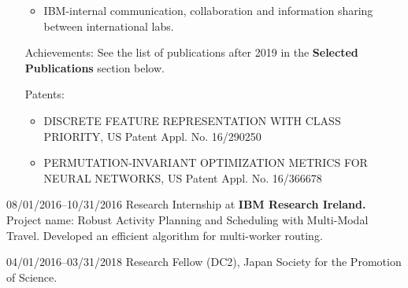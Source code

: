 \documentclass[letterpaper,11pt]{article}
\begin{document}
\begin{CV}
\begin{itemize}
\begin{itemize}
               \item IBM-internal communication, collaboration and information sharing between international labs.
              \end{itemize}
 \item[Achievements:] See the list of publications after 2019 in the \textbf{Selected Publications} section below.
 \item[Patents:]
              \begin{itemize}
               \item DISCRETE FEATURE REPRESENTATION WITH CLASS PRIORITY, US Patent Appl. No. 16/290250
               \item PERMUTATION-INVARIANT OPTIMIZATION METRICS FOR NEURAL NETWORKS, US Patent Appl. No. 16/366678
              \end{itemize}
\end{itemize}

\item[08/01/2016--10/31/2016] Research Internship at \textbf{IBM Research Ireland.}
 Project name: Robust Activity Planning and Scheduling with Multi-Modal Travel.
 Developed an efficient algorithm for multi-worker routing.

\item[04/01/2016--03/31/2018] Research Fellow (DC2), Japan Society for the Promotion of Science.




\end{CV}
\end{document}

